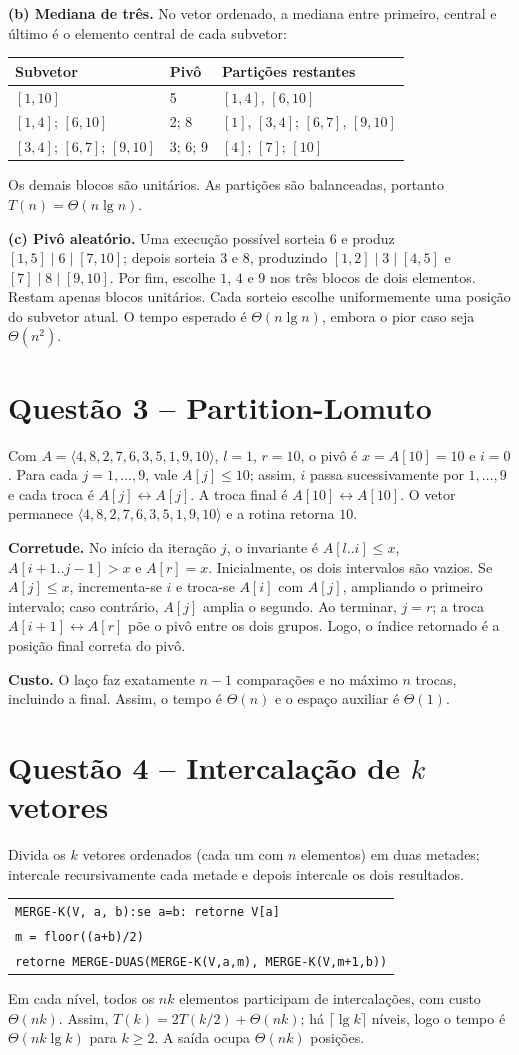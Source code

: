 \documentclass[10pt,a4paper]{article}
\newcommand{\questao}[1]{\section*{\color{azul}Questão #1}}
\newcommand{\vet}[1]{\langle #1\rangle}
\begin{document}
\textbf{(b) Mediana de três.} No vetor ordenado, a mediana entre primeiro, central e último é o elemento central de cada subvetor:
\begin{center}
\begin{tabular}{@{}lll@{}}
\toprule
Subvetor & Pivô & Partições restantes\\
\midrule
$[1,10]$ & 5 & $[1,4]$, $[6,10]$\\
$[1,4]$; $[6,10]$ & 2; 8 & $[1]$, $[3,4]$; $[6,7]$, $[9,10]$\\
$[3,4]$; $[6,7]$; $[9,10]$ & 3; 6; 9 & $[4]$; $[7]$; $[10]$\\
\bottomrule
\end{tabular}
\end{center}
Os demais blocos são unitários. As partições são balanceadas, portanto $T(n)=\Theta(n\lg n)$.

\textbf{(c) Pivô aleatório.} Uma execução possível sorteia $6$ e produz $[1,5]\mid6\mid[7,10]$; depois sorteia $3$ e $8$, produzindo $[1,2]\mid3\mid[4,5]$ e $[7]\mid8\mid[9,10]$. Por fim, escolhe $1$, $4$ e $9$ nos três blocos de dois elementos. Restam apenas blocos unitários. Cada sorteio escolhe uniformemente uma posição do subvetor atual. O tempo esperado é $\Theta(n\lg n)$, embora o pior caso seja $\Theta(n^2)$.

\newpage
\questao{3 -- Partition-Lomuto}
Com $A=\vet{4,8,2,7,6,3,5,1,9,10}$, $l=1$, $r=10$, o pivô é $x=A[10]=10$ e $i=0$. Para cada $j=1,\ldots,9$, vale $A[j]\le10$; assim, $i$ passa sucessivamente por $1,\ldots,9$ e cada troca é $A[j]\leftrightarrow A[j]$. A troca final é $A[10]\leftrightarrow A[10]$. O vetor permanece $\vet{4,8,2,7,6,3,5,1,9,10}$ e a rotina retorna $10$.

\textbf{Corretude.} No início da iteração $j$, o invariante é $A[l..i]\le x$, $A[i+1..j-1]>x$ e $A[r]=x$. Inicialmente, os dois intervalos são vazios. Se $A[j]\le x$, incrementa-se $i$ e troca-se $A[i]$ com $A[j]$, ampliando o primeiro intervalo; caso contrário, $A[j]$ amplia o segundo. Ao terminar, $j=r$; a troca $A[i+1]\leftrightarrow A[r]$ põe o pivô entre os dois grupos. Logo, o índice retornado é a posição final correta do pivô.

\textbf{Custo.} O laço faz exatamente $n-1$ comparações e no máximo $n$ trocas, incluindo a final. Assim, o tempo é $\Theta(n)$ e o espaço auxiliar é $\Theta(1)$.

\questao{4 -- Intercalação de $k$ vetores}
Divida os $k$ vetores ordenados (cada um com $n$ elementos) em duas metades; intercale recursivamente cada metade e depois intercale os dois resultados.
\begin{center}
\begin{tabular}{@{}l@{}}
\texttt{MERGE-K(V, a, b):}\quad\texttt{se a=b: retorne V[a]}\\
\quad\texttt{m = floor((a+b)/2)}\\
\quad\texttt{retorne MERGE-DUAS(MERGE-K(V,a,m), MERGE-K(V,m+1,b))}
\end{tabular}
\end{center}
Em cada nível, todos os $nk$ elementos participam de intercalações, com custo $\Theta(nk)$. Assim, $T(k)=2T(k/2)+\Theta(nk)$; há $\lceil\lg k\rceil$ níveis, logo o tempo é $\Theta(nk\lg k)$ para $k\ge2$. A saída ocupa $\Theta(nk)$ posições.
\end{document}
